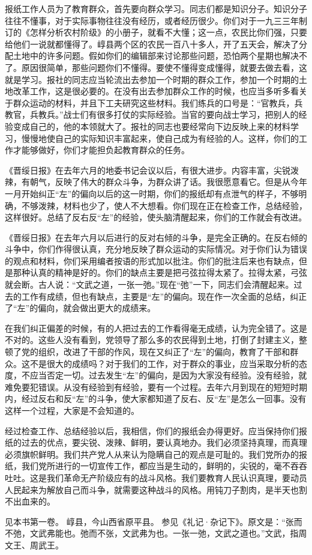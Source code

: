 报纸工作人员为了教育群众，首先要向群众学习。同志们都是知识分子。知识分子往往不懂事，对于实际事物往往没有经历，或者经历很少。你们对于一九三三年制订的《怎样分析农村阶级》的小册子，就看不大懂；这一点，农民比你们强，只要给他们一说就都懂得了。崞县两个区的农民一百八十多人，开了五天会，解决了分配土地中的许多问题。假如你们的编辑部来讨论那些问题，恐怕两个星期也解决不了。原因很简单，那些问题你们不懂得。要使不懂得变成懂得，就要去做去看，这就是学习。报社的同志应当轮流出去参加一个时期的群众工作，参加一个时期的土地改革工作，这是很必要的。在没有出去参加群众工作的时候，也应当多听多看关于群众运动的材料，并且下工夫研究这些材料。我们练兵的口号是：“官教兵，兵教官，兵教兵。”战士们有很多打仗的实际经验。当官的要向战士学习，把别人的经验变成自己的，他的本领就大了。报社的同志也要经常向下边反映上来的材料学习，慢慢地使自己的实际知识丰富起来，使自己成为有经验的人。这样，你们的工作才能够做好，你们才能担负起教育群众的任务。

《晋绥日报》在去年六月的地委书记会议以后，有很大进步。内容丰富，尖锐泼辣，有朝气，反映了伟大的群众斗争，为群众讲了话。我很愿意看它。但是从今年一月开始纠正“左”的偏向以后的这一时期，你们的报纸却有点泄气的样子，不够明确，不够泼辣，材料也少了，使人不大想看。你们现在正在检查工作，总结经验，这样很好。总结了反右反“左”的经验，使头脑清醒起来，你们的工作就会有改进。

《晋绥日报》在去年六月以后进行的反对右倾的斗争，是完全正确的。在反右倾的斗争中，你们作得很认真，充分地反映了群众运动的实际情况。对于你们认为错误的观点和材料，你们采用编者按语的形式加以批注。你们的批注后来也有缺点，但是那种认真的精神是好的。你们的缺点主要是把弓弦拉得太紧了。拉得太紧，弓弦就会断。古人说：“文武之道，一张一弛。”现在“弛”一下，同志们会清醒起来。过去的工作有成绩，但也有缺点，主要是“左”的偏向。现在作一次全面的总结，纠正了“左”的偏向，就会做出更大的成绩来。

在我们纠正偏差的时候，有的人把过去的工作看得毫无成绩，认为完全错了。这是不对的。这些人没有看到，党领导了那么多的农民得到土地，打倒了封建主义，整顿了党的组织，改进了干部的作风，现在又纠正了“左”的偏向，教育了干部和群众。这不是很大的成绩吗？对于我们的工作，对于群众的事业，应当采取分析的态度，不应当否定一切。过去发生“左”的偏向，是因为大家没有经验。没有经验，就难免要犯错误。从没有经验到有经验，要有一个过程。去年六月到现在的短短时期内，经过反右和反“左”的斗争，使大家都知道了反右、反“左”是怎么一回事。没有这样一个过程，大家是不会知道的。

经过检查工作、总结经验以后，我相信，你们的报纸会办得更好。应当保持你们报纸的过去的优点，要尖锐、泼辣、鲜明，要认真地办。我们必须坚持真理，而真理必须旗帜鲜明。我们共产党人从来认为隐瞒自己的观点是可耻的。我们党所办的报纸，我们党所进行的一切宣传工作，都应当是生动的，鲜明的，尖锐的，毫不吞吞吐吐。这是我们革命无产阶级应有的战斗风格。我们要教育人民认识真理，要动员人民起来为解放自己而斗争，就需要这种战斗的风格。用钝刀子割肉，是半天也割不出血来的。


\begin{maonote}
见本书第一卷。
崞县，今山西省原平县。
参见《礼记·杂记下》。原文是：“张而不弛，文武弗能也。弛而不张，文武弗为也。一张一弛，文武之道也。”文武，指周文王、周武王。
\end{maonote}

